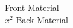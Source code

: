 \documentclass[frontgrid]{flacards}
\begin{document}
\card
	{Front Material\\
		$x^2$}
	{Back Material}
\end{document}
